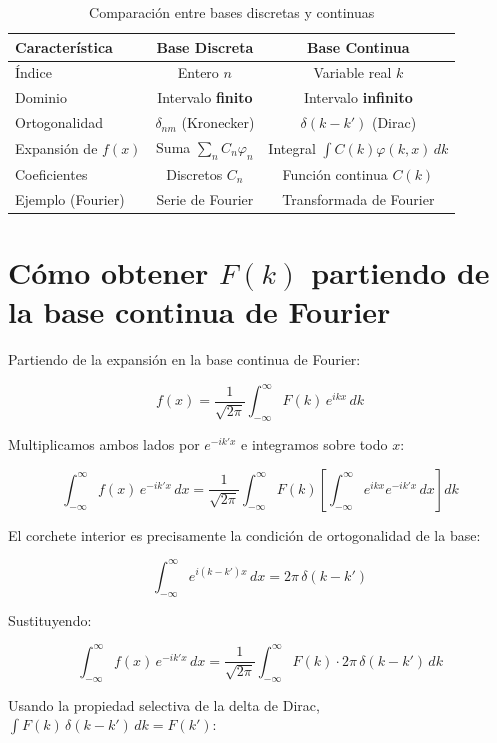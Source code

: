 \documentclass[a4paper]{article}
\begin{document}
\begin{table}[h!]
\centering
\renewcommand{\arraystretch}{1.3} %
\caption{Comparación entre bases discretas y continuas}
\label{tab:discreta_vs_continua}
\begin{tabular}{lcc}
\toprule
\textbf{Característica} & \textbf{Base Discreta} & \textbf{Base Continua} \\
\midrule
Índice & Entero $n$ & Variable real $k$ \\
Dominio & Intervalo \textbf{finito} & Intervalo \textbf{infinito} \\
Ortogonalidad & $\delta_{nm}$ (Kronecker) & $\delta(k-k')$ (Dirac) \\
Expansión de $f(x)$ & Suma $\sum_n C_n \varphi_n$ & Integral $\int C(k)\varphi(k,x)\,dk$ \\
Coeficientes & Discretos $C_n$ & Función continua $C(k)$ \\
Ejemplo (Fourier) & Serie de Fourier & Transformada de Fourier \\
\bottomrule
\end{tabular}
\end{table}

\section{Cómo obtener $F(k)$ partiendo de la base continua de Fourier}

Partiendo de la expansión en la base continua de Fourier:

$$f(x) = \frac{1}{\sqrt{2\pi}}\int_{-\infty}^{\infty} F(k)\, e^{ikx}\, dk$$

Multiplicamos ambos lados por $e^{-ik'x}$ e integramos sobre todo $x$:

$$\int_{-\infty}^{\infty} f(x)\, e^{-ik'x}\, dx = \frac{1}{\sqrt{2\pi}}\int_{-\infty}^{\infty} F(k) \left[\int_{-\infty}^{\infty} e^{ikx}e^{-ik'x}\, dx\right] dk$$

El corchete interior es precisamente la condición de ortogonalidad de la base:

$$\int_{-\infty}^{\infty} e^{i(k-k')x}\, dx = 2\pi\,\delta(k - k')$$

Sustituyendo:

$$\int_{-\infty}^{\infty} f(x)\, e^{-ik'x}\, dx = \frac{1}{\sqrt{2\pi}}\int_{-\infty}^{\infty} F(k)\cdot 2\pi\,\delta(k-k')\, dk$$

Usando la propiedad selectiva de la delta de Dirac, $\int F(k)\,\delta(k - k')\,dk = F(k')$:
\end{document}
